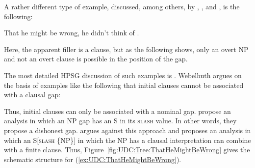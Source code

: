 \documentclass[output=paper,biblatex,babelshorthands,newtxmath,draftmode,colorlinks,citecolor=brown]{langscibook}
\begin{document}
A rather different type of example, discussed, among others, by
\citet[Chapter~2]{Bresnan01}, \citet[25--26]{Bouma:Malouf:Sag:01}, and \citet{Webelhuth:12},
is the following:

\begin{exe}
\ex  \label{ex:UDC:ThatHeMightBeWrong}  That he might be wrong, he didn't think of \trace{}.
\end{exe}

\noindent
Here, the apparent filler is a clause, but as the following shows, only
an overt NP and not an overt clause is possible in the position of the
gap.

\begin{exe}
\ex
\begin{xlist}
\end{xlist}
\end{exe}

\noindent
The most detailed HPSG discussion of such examples is \citet{Webelhuth:12}.
Webelhuth argues on the basis of examples like the following that initial
clauses cannot be associated with a clausal gap:

\begin{exe} \ex \begin{xlist} 
\end{xlist}
\end{exe}

\begin{exe} \ex \begin{xlist} 
\end{xlist}
\end{exe}

\begin{exe} \ex \begin{xlist} 
\end{xlist}
\end{exe}

\noindent
Thus, initial clauses can only be associated with a nominal
gap. \citet[25--26]{Bouma:Malouf:Sag:01} propose an analysis in which
an NP gap has an S in its \textsc{slash} value. In other words, they propose a
dishonest gap.  \citet{Webelhuth:12} argues against this approach and
proposes an analysis in which an S[\textsc{slash} \{NP\}] in which the NP
has a clausal interpretation can combine with a finite clause. Thus,
Figure~\ref{fig:UDC:Tree:ThatHeMightBeWrong} gives the schematic
structure for (\ref{ex:UDC:ThatHeMightBeWrong}).
\end{document}
